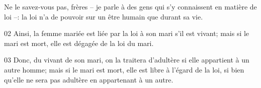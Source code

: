 Ne le savez-vous pas, frères – je parle à des gens qui s’y connaissent en matière de loi –: la loi n’a de pouvoir sur un être humain que durant sa vie.

02 Ainsi, la femme mariée est liée par la loi à son mari s’il est vivant; mais si le mari est mort, elle est dégagée de la loi du mari.

03 Donc, du vivant de son mari, on la traitera d’adultère si elle appartient à un autre homme; mais si le mari est mort, elle est libre à l’égard de la loi, si bien qu’elle ne sera pas adultère en appartenant à un autre.
